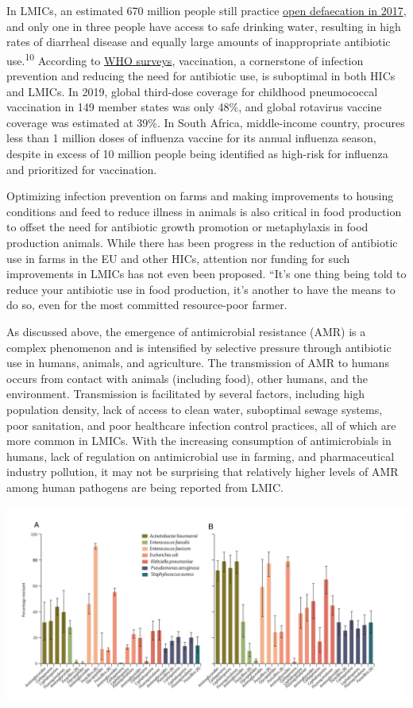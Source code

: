\documentclass[
]{book}
\begin{document}
In LMICs, an estimated 670 million people still practice \href{https://blogs.worldbank.org/opendata/open-defeca\%20tion-nearly-halved-2000-still-practiced-670-million}{open defaecation in 2017}, and only one in three people have access to safe drinking water, resulting in high rates of diarrheal disease and equally large amounts of inappropriate antibiotic use.\textsuperscript{10} According to \href{https://www.who.int/news-room/\%20fact-sheets/detail/immunization-coverage.}{WHO surveys}, vaccination, a cornerstone of infection prevention and reducing the need for antibiotic use, is suboptimal in both HICs and LMICs. In 2019, global third-dose coverage for childhood pneumococcal vaccination in 149 member states was only 48\%, and global rotavirus vaccine coverage was estimated at 39\%. In South Africa, middle-income country, procures less than 1 million doses of influenza vaccine for its annual influenza season, despite in excess of 10 million people being identified as high-risk for influenza and prioritized for vaccination.

Optimizing infection prevention on farms and making improvements to housing conditions and feed to reduce illness in animals is also critical in food production to offset the need for antibiotic growth promotion or metaphylaxis in food production animals. While there has been progress in the reduction of antibiotic use in farms in the EU and other HICs, attention nor funding for such improvements in LMICs has not even been proposed. ``It's one thing being told to reduce your antibiotic use in food production, it's another to have the means to do so, even for the most committed resource-poor farmer.

As discussed above, the emergence of antimicrobial resistance (AMR) is a complex phenomenon and is intensified by selective pressure through antibiotic use in humans, animals, and agriculture. The transmission of AMR to humans occurs from contact with animals (including food), other humans, and the environment. Transmission is facilitated by several factors, including high population density, lack of access to clean water, suboptimal sewage systems, poor sanitation, and poor healthcare infection control practices, all of which are more common in LMICs. With the increasing consumption of antimicrobials in humans, lack of regulation on antimicrobial use in farming, and pharmaceutical industry pollution, it may not be surprising that relatively higher levels of AMR among human pathogens are being reported from LMIC.

\includegraphics[width=31.25in,height=\textheight]{images/worldwideresistance.png}
\end{document}

